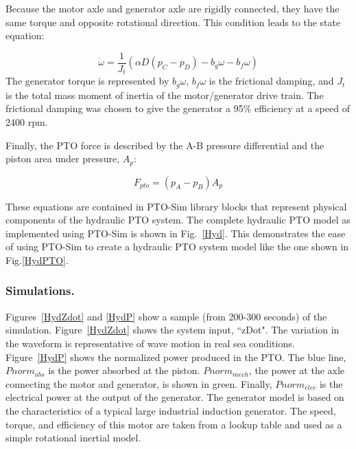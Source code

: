 \documentclass[twocolumn,10pt]{asme2e}
\begin{document}
Because the motor axle and generator axle are rigidly connected, they have the same torque and opposite rotational direction. This condition leads to the state equation:

\begin{equation}
\dot{\omega}=\frac{1}{J_t}(\alpha D (p_C-p_D)-b_g \omega-b_f \omega)
\end{equation}
%
The generator torque is represented by $b_g$$\omega$, $b_f$$\omega$ is the frictional damping, and $J_t$ is the total mass moment of inertia of the motor/generator drive train.  The frictional damping was chosen to give the generator a 95\% efficiency at a speed of 2400 rpm. 

Finally, the PTO force is described by the A-B pressure differential and the piston area under pressure, $A_p$:

\begin{equation}
F_{pto}=(p_A-p_B)A_p
\end{equation}

These equations are contained in PTO-Sim library blocks that represent physical components of the hydraulic PTO system. The complete hydraulic PTO model as implemented using PTO-Sim is shown in Fig.~\ref{Hyd}. This demonstrates the ease of using PTO-Sim to create a hydraulic PTO system model like the one shown in Fig.\ref{HydPTO}.

\subsubsection*{Simulations.}

Figures~\ref{HydZdot} and \ref{HydP} show a sample (from 200-300 seconds) of the simulation. Figure~\ref{HydZdot} shows the system input, ``zDot". The variation in the waveform is representative of wave motion in real sea conditions. Figure~\ref{HydP} shows the normalized power produced in the PTO. The blue line, $Pnorm_{abs}$ is the power absorbed at the piston. $Pnorm_{mech}$, the power at the axle connecting the motor and generator, is shown in green. Finally, $Pnorm_{elec}$ is the electrical power at the output of the generator. The generator model is based on the characteristics of a typical large industrial induction generator. The speed, torque, and efficiency of this motor are taken from a lookup table and used as a simple rotational inertial model. 


\end{document}
